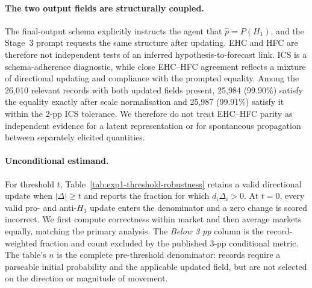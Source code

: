 \paragraph{The two output fields are structurally coupled.}
The final-output schema explicitly instructs the agent that
$\hat p=P(H_1)$, and the Stage~3 prompt requests the same structure after
updating. EHC and HFC are therefore not independent tests of an inferred
hypothesis-to-forecast link. ICS is a schema-adherence diagnostic, while close
EHC--HFC agreement reflects a mixture of directional updating and compliance
with the prompted equality. Among the 26,010 relevant records with both updated
fields present, 25,984 (99.90\%) satisfy the equality exactly after scale
normalisation and 25,987 (99.91\%) satisfy it within the 2-pp ICS tolerance. We
therefore do not treat EHC--HFC parity as independent evidence for a latent
representation or for spontaneous propagation between separately elicited
quantities.

\paragraph{Unconditional estimand.}
For threshold $t$, Table~\ref{tab:exp1-threshold-robustness} retains a valid
directional update when $|\Delta|\geq t$ and reports the fraction for which
$d_i\Delta_i>0$. At $t=0$, every valid pro- and anti-$H_1$ update enters the
denominator and a zero change is scored incorrect. We first compute correctness
within market and then average markets equally, matching the primary analysis.
The \emph{Below 3 pp} column is the record-weighted fraction and count excluded
by the published 3-pp conditional metric. The table's $n$ is the complete
pre-threshold denominator: records require a parseable initial probability and
the applicable updated field, but are not selected on the direction or magnitude
of movement.

\begin{center}
\begin{minipage}{\linewidth}
\centering
{}
\label{tab:exp1-threshold-robustness}
\scriptsize
\setlength{\tabcolsep}{4pt}
\resizebox{\linewidth}{!}{%

}
\end{minipage}
\end{center}

